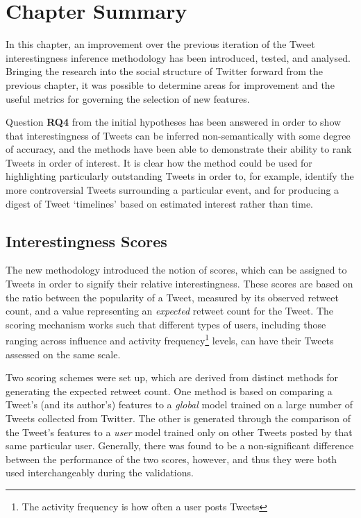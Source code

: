 \section{Chapter Summary}
In this chapter, an improvement over the previous iteration of the Tweet interestingness inference methodology has been introduced, tested, and analysed. Bringing the research into the social structure of Twitter forward from the previous chapter, it was possible to determine areas for improvement and the useful metrics for governing the selection of new features. 

Question \textbf{RQ4} from the initial hypotheses has been answered in order to show that interestingness of Tweets can be inferred non-semantically with some degree of accuracy, and the methods have been able to demonstrate their ability to rank Tweets in order of interest. It is clear how the method could be used for highlighting particularly outstanding Tweets in order to, for example, identify the more controversial Tweets surrounding a particular event, and for producing a digest of Tweet `timelines' based on estimated interest rather than time.

\subsection{Interestingness Scores}
The new methodology introduced the notion of scores, which can be assigned to Tweets in order to signify their relative interestingness. These scores are based on the ratio between the popularity of a Tweet, measured by its observed retweet count, and a value representing an \textit{expected} retweet count for the Tweet. The scoring mechanism works such that different types of users, including those ranging across influence and activity frequency\footnote{The activity frequency is how often a user posts Tweets} levels, can have their Tweets assessed on the same scale. 

Two scoring schemes were set up, which are derived from distinct methods for generating the expected retweet count. One method is based on comparing a Tweet's (and its author's) features to a \textit{global} model trained on a large number of Tweets collected from Twitter. The other is generated through the comparison of the Tweet's features to a \textit{user} model trained only on other Tweets posted by that same particular user. Generally, there was found to be a non-significant difference between the performance of the two scores, however, and thus they were both used interchangeably during the validations.

